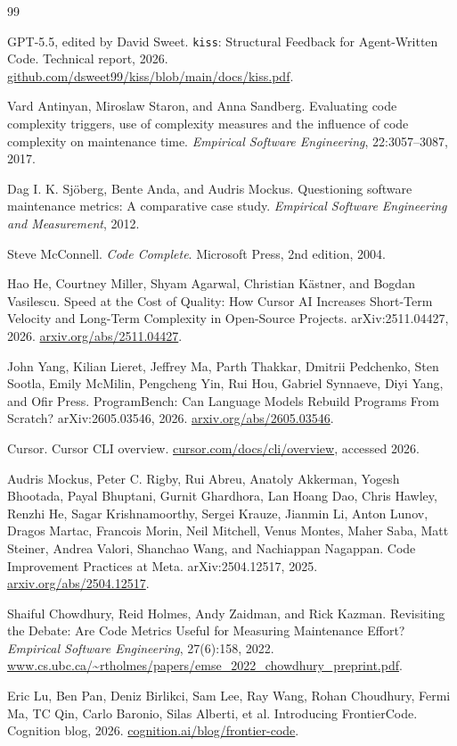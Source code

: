 \documentclass[11pt]{article}
\begin{document}
\begin{thebibliography}{99}

GPT-5.5, edited by David Sweet.
\newblock \texttt{kiss}: Structural Feedback for Agent-Written Code.
\newblock Technical report, 2026.
\newblock \url{github.com/dsweet99/kiss/blob/main/docs/kiss.pdf}.

Vard Antinyan, Miroslaw Staron, and Anna Sandberg.
\newblock Evaluating code complexity triggers, use of complexity measures and
the influence of code complexity on maintenance time.
\newblock \emph{Empirical Software Engineering}, 22:3057--3087, 2017.

Dag I. K. Sj\"oberg, Bente Anda, and Audris Mockus.
\newblock Questioning software maintenance metrics: A comparative case study.
\newblock \emph{Empirical Software Engineering and Measurement}, 2012.

Steve McConnell.
\newblock \emph{Code Complete}.
\newblock Microsoft Press, 2nd edition, 2004.

Hao He, Courtney Miller, Shyam Agarwal, Christian K\"astner, and Bogdan Vasilescu.
\newblock Speed at the Cost of Quality: How Cursor AI Increases Short-Term Velocity and Long-Term Complexity in Open-Source Projects.
\newblock arXiv:2511.04427, 2026.
\newblock \url{arxiv.org/abs/2511.04427}.

John Yang, Kilian Lieret, Jeffrey Ma, Parth Thakkar, Dmitrii Pedchenko, Sten Sootla, Emily McMilin, Pengcheng Yin, Rui Hou, Gabriel Synnaeve, Diyi Yang, and Ofir Press.
\newblock ProgramBench: Can Language Models Rebuild Programs From Scratch?
\newblock arXiv:2605.03546, 2026.
\newblock \url{arxiv.org/abs/2605.03546}.

Cursor.
\newblock Cursor CLI overview.
\newblock \url{cursor.com/docs/cli/overview}, accessed 2026.

Audris Mockus, Peter C. Rigby, Rui Abreu, Anatoly Akkerman, Yogesh Bhootada, Payal Bhuptani, Gurnit Ghardhora, Lan Hoang Dao, Chris Hawley, Renzhi He, Sagar Krishnamoorthy, Sergei Krauze, Jianmin Li, Anton Lunov, Dragos Martac, Francois Morin, Neil Mitchell, Venus Montes, Maher Saba, Matt Steiner, Andrea Valori, Shanchao Wang, and Nachiappan Nagappan.
\newblock Code Improvement Practices at Meta.
\newblock arXiv:2504.12517, 2025.
\newblock \url{arxiv.org/abs/2504.12517}.

Shaiful Chowdhury, Reid Holmes, Andy Zaidman, and Rick Kazman.
\newblock Revisiting the Debate: Are Code Metrics Useful for Measuring Maintenance Effort?
\newblock \emph{Empirical Software Engineering}, 27(6):158, 2022.
\newblock \url{www.cs.ubc.ca/~rtholmes/papers/emse_2022_chowdhury_preprint.pdf}.

Eric Lu, Ben Pan, Deniz Birlikci, Sam Lee, Ray Wang, Rohan Choudhury, Fermi Ma, TC Qin, Carlo Baronio, Silas Alberti, et al.
\newblock Introducing FrontierCode.
\newblock Cognition blog, 2026.
\newblock \url{cognition.ai/blog/frontier-code}.
\end{thebibliography}
\end{document}
